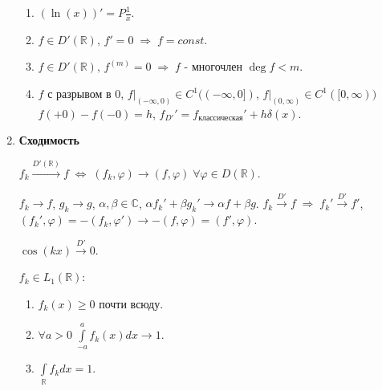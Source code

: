 \begin{enumerate}
\begin{example}
\begin{enumerate}
      \end{enumerate}
    \end{example}
    \begin{exercise}
      \begin{enumerate}
        \item $(\ln (x))' = P\frac{1}{x}$.\\
        \item $f \in D' (\mathbb{R}) \text{, } f' = 0 \; \Rightarrow \; f = const$.\\
        \item $f \in D' (\mathbb{R}) \text{, } f^{(m)} = 0 \; \Rightarrow \; f \text{ - многочлен } \deg f < m$.\\
        \item $f$ с разрывом в $0$, $\left.f\right|_{(- \infty, 0)} \in C^{1} ((- \infty, 0])$, $\left.f\right|_{(0, \infty)} \in C^{1} ([0, \infty))$ $f(+ 0) - f(- 0) = h$, $f_{D'}' = f_{\text{классическая}}' + h \delta (x)$.
      \end{enumerate}
    \end{exercise}
  \item \textbf{Сходимость}\\
    \begin{definition}
      $f_{k} \xrightarrow{D' (\mathbb{R})} f \; \Leftrightarrow \; (f_{k}, \varphi) \rightarrow (f, \varphi) \; \forall \varphi \in D (\mathbb{R})$.
    \end{definition}
    $f_{k} \rightarrow f$, $g_{k} \rightarrow g$, $\alpha, \beta \in \mathbb{C}$, $\alpha f_{k}' + \beta g_{k}' \rightarrow \alpha f + \beta g$. $f_{k} \xrightarrow{D'} f \; \Rightarrow \; f_{k}' \xrightarrow{D'} f'$, $(f_{k}', \varphi) = - (f_{k}, \varphi') \rightarrow - (f, \varphi) = (f', \varphi)$.
    \begin{exercise}
      $\cos (k x) \xrightarrow{D'} 0$.
    \end{exercise}
    \begin{theorem}
      $f_{k} \in L_{1} (\mathbb{R})$:\\
      \begin{enumerate}
        \item $f_{k} (x) \geqslant 0$ почти всюду.\\
        \item $\forall a > 0 \; \int\limits_{- a}^{a} f_{k} (x) d x \rightarrow 1$.\\
        \item $\int\limits_{\mathbb{R}} f_{k} d x = 1$.
      \end{enumerate}

\end{theorem}
\end{enumerate}
